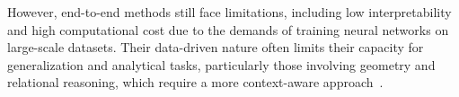 However, end-to-end methods still face limitations, including low interpretability and high computational cost due to the demands of training neural networks on large-scale datasets. Their data-driven nature often limits their capacity for generalization and analytical tasks, particularly those involving geometry and relational reasoning, which require a more context-aware approach~\cite{chen_unigeo_2022, villalobos_will_2024, gupta_visual_2023}.

